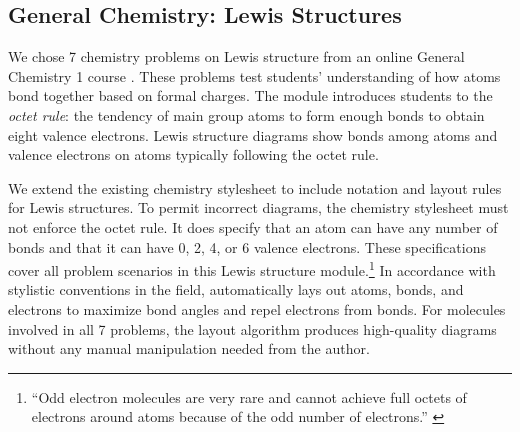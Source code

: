 \subsection{General Chemistry: Lewis Structures}
\label{sec:chemistry}


We chose 7 chemistry problems on Lewis structure from an online General Chemistry 1 course \cite{oli}. These problems test students' understanding of how atoms bond together based on formal charges. The module introduces students to the \textit{octet rule}: the tendency of main group atoms to form enough bonds to obtain eight valence electrons. Lewis structure diagrams show bonds among atoms and valence electrons on atoms typically following the octet rule. 



We extend the existing \Penrose chemistry stylesheet to include notation and layout rules for Lewis structures. To permit incorrect diagrams, the chemistry stylesheet must not enforce the octet rule. It does specify that an atom can have any number of bonds and that it can have 0, 2, 4, or 6 valence electrons. These specifications cover all problem scenarios in this Lewis structure module.\footnote{``Odd electron molecules are very rare and cannot achieve full octets of electrons around atoms because of the odd number of electrons.'' \cite{oli}} In accordance with stylistic conventions in the field, \Edgeworth automatically lays out atoms, bonds, and electrons to maximize bond angles and repel electrons from bonds. 
 For molecules involved in all 7 problems, the layout algorithm produces high-quality diagrams without any manual manipulation needed from the author. 


